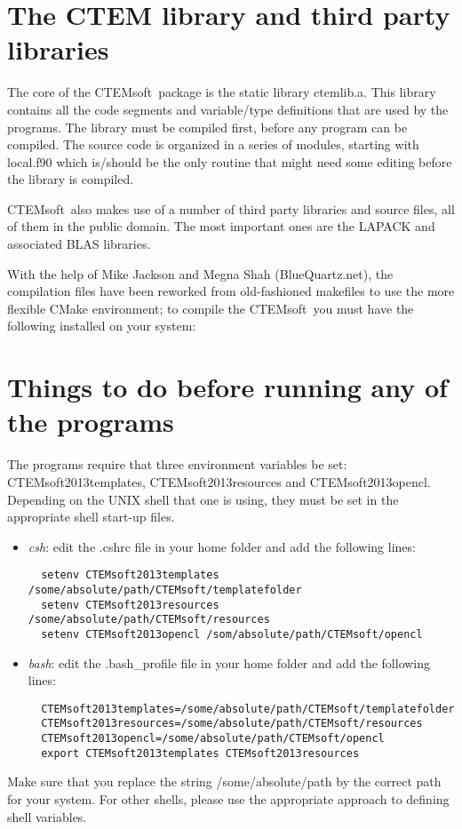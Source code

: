 \documentclass[DIV=calc, paper=letter, fontsize=11pt]{scrartcl}	 %
\newcommand{\ctp}{\textsf{CTEMsoft}}
\begin{document}
\newpage
\section{The CTEM library and third party libraries\label{sec:library}}
The core of the \ctp\ package is the static library \textsf{ctemlib.a}.  This library contains all the code segments and variable/type definitions
that are used by the programs.  The library must be compiled first, before any program can be compiled.  The source code is organized 
in a series of modules, starting with \textsf{local.f90} which is/should be the only routine that might need some editing before the library is 
compiled.  

\ctp\ also makes use of a number of third party libraries and source files, all of them in the public domain.  The most important ones are 
the LAPACK and associated BLAS libraries. 

With the help of Mike Jackson and Megna Shah (BlueQuartz.net), the compilation files have been reworked from old-fashioned
makefiles to use the more flexible CMake environment; to compile the \ctp\ you must have the following installed on your system:




\newpage
\section{Things to do before running any of the programs\label{sec:todo}}
The programs require that three environment variables be set: \textsf{CTEMsoft2013templates},
\textsf{CTEMsoft2013resources} and \textsf{CTEMsoft2013opencl}.  Depending on the UNIX shell that one is using, they must be set in
the appropriate shell start-up files.

\begin{itemize}
\item \textit{csh}: edit the \textsf{.cshrc} file in your home folder and add the following lines:
\begin{verbatim}
  setenv CTEMsoft2013templates /some/absolute/path/CTEMsoft/templatefolder
  setenv CTEMsoft2013resources /some/absolute/path/CTEMsoft/resources
  setenv CTEMsoft2013opencl /som/absolute/path/CTEMsoft/opencl
\end{verbatim}
\item \textit{bash}: edit the \textsf{.bash\_profile} file in your home folder and add the following lines:
\begin{verbatim}
  CTEMsoft2013templates=/some/absolute/path/CTEMsoft/templatefolder
  CTEMsoft2013resources=/some/absolute/path/CTEMsoft/resources
  CTEMsoft2013opencl=/some/absolute/path/CTEMsoft/opencl
  export CTEMsoft2013templates CTEMsoft2013resources
\end{verbatim}
\end{itemize}
Make sure that you replace the string \textsf{/some/absolute/path} by the correct path for your system.
For other shells, please use the appropriate approach to defining shell variables.
\end{document}
